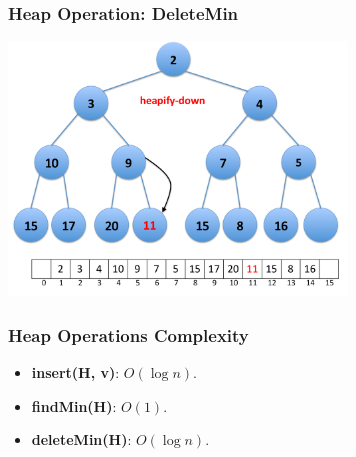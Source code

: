 \documentclass{beamer}
\begin{document}
\begin{frame}[containsverbatim]
\frametitle{Heap Operation: DeleteMin}

\begin{center}
\includegraphics[width=9cm]{heap_delete_min5.pdf}%
\end{center}

\end{frame}

\begin{frame}%
\frametitle{Heap Operations Complexity}

\begin{itemize}

\item \textbf{insert(H, v)}: $O(\log n)$.
\vspace{0.6cm}

\item \textbf{findMin(H)}: $O(1)$.
\vspace{0.6cm}

\item \textbf{deleteMin(H)}: $O(\log n)$.

\end{itemize}

\end{frame}
\end{document}
